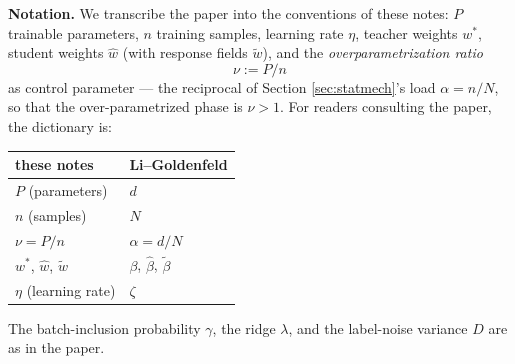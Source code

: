 \documentclass[11pt]{article}
\begin{document}
\textbf{Notation.} We transcribe the paper into the conventions of these notes: $P$ trainable parameters, $n$ training samples, learning rate $\eta$, teacher weights $w^*$, student weights $\hat w$ (with response fields $\tilde w$), and the \emph{overparametrization ratio}
%
\begin{equation}
    \nu := P/n
\end{equation}
%
as control parameter --- the reciprocal of Section \ref{sec:statmech}'s load $\alpha = n/N$, so that the over-parametrized phase is $\nu>1$. For readers consulting the paper, the dictionary is:
%
\begin{center}
\begin{tabular}{l|l}
these notes & Li--Goldenfeld \cite{liBrokenErgodicityViolation2026} \\\hline
$P$ (parameters) & $d$ \\
$n$ (samples) & $N$ \\
$\nu = P/n$ & $\alpha = d/N$ \\
$w^*$, $\hat w$, $\tilde w$ & $\beta$, $\hat\beta$, $\tilde\beta$ \\
$\eta$ (learning rate) & $\zeta$
\end{tabular}
\end{center}
%
The batch-inclusion probability $\gamma$, the ridge $\lambda$, and the label-noise variance $D$ are as in the paper.
\end{document}
